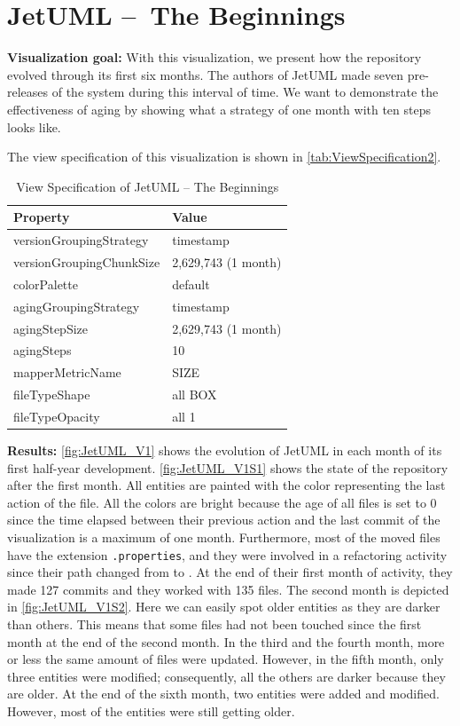 \clearpage
\section{JetUML – The Beginnings}

\noindent
\textbf{Visualization goal:}
With this visualization, we present how the repository evolved through its first six months. 
The authors of JetUML made seven pre-releases of the system during this interval of time.
We want to demonstrate the effectiveness of aging by showing what a strategy of one month with ten steps looks like. 

The view specification of this visualization is shown in \autoref{tab:ViewSpecification2}.
\begin{table}[h]
	\small
    \centering
    \begin{tabular}{@{}ll@{}} 
        \toprule
        \textbf{Property} & \textbf{Value} \\\midrule
        versionGroupingStrategy & timestamp\\ 
		versionGroupingChunkSize & 2,629,743 (1 month)\\
		colorPalette & default\\
		agingGroupingStrategy & timestamp \\
		agingStepSize & 2,629,743 (1 month) \\
		agingSteps & 10 \\
		mapperMetricName & SIZE \\
		fileTypeShape & all BOX \\
		fileTypeOpacity & all 1 \\\bottomrule
    \end{tabular}
    \caption{View Specification of JetUML – The Beginnings}
    \label{tab:ViewSpecification2}
\end{table}


\bigbreak
\noindent
\textbf{Results:}
\autoref{fig:JetUML_V1} shows the evolution of JetUML in each month of its first half-year development. \autoref{fig:JetUML_V1S1} shows the state of the repository after the first month. All entities are painted with the color representing the last action of the file. All the colors are bright because the age of all files is set to 0 since the time elapsed between their previous action and the last commit of the visualization is a maximum of one month. Furthermore, most of the moved files have the extension \texttt{.properties}, and they were involved in a refactoring activity since their path changed from  to .  At the end of their first month of activity, they made 127 commits and they worked with 135 files. The second month is depicted in \autoref{fig:JetUML_V1S2}. Here we can easily spot older entities as they are darker than others. This means that some files had not been touched since the first month at the end of the second month. In the third and the fourth month, more or less the same amount of files were updated. However, in the fifth month, only three entities were modified; consequently, all the others are darker because they are older. 
At the end of the sixth month, two entities were added and modified. However, most of the entities were still getting older. 

